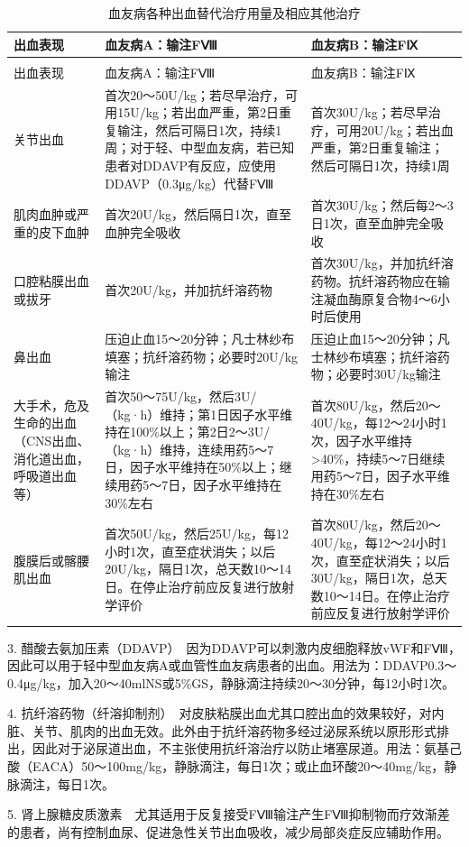 \begin{longtable}[]{p{3cm}p{5cm}p{5cm}}
    \caption{血友病各种出血替代治疗用量及相应其他治疗}
    \label{tab5-5-1}\\
\toprule
出血表现 & 血友病A：输注FⅧ & 血友病B：输注FⅨ\tabularnewline
\midrule
\endfirsthead
\caption[]{血友病各种出血替代治疗用量及相应其他治疗}\\
\toprule
出血表现 & 血友病A：输注FⅧ & 血友病B：输注FⅨ\tabularnewline
\midrule
\endhead
\bottomrule
\endfoot
关节出血 &首次20～50U/kg；若尽早治疗，可用15U/kg；若出血严重，第2日重复输注，然后可隔日1次，持续1周；对于轻、中型血友病，若已知患者对DDAVP有反应，应使用DDAVP（0.3μg/kg）代替FⅧ&首次30U/kg；若尽早治疗，可用20U/kg；若出血严重，第2日重复输注；然后可隔日1次，持续1周\tabularnewline
肌肉血肿或严重的皮下血肿 & 首次20U/kg，然后隔日1次，直至血肿完全吸收 &
首次30U/kg；然后每2～3日1次，直至血肿完全吸收\tabularnewline
口腔粘膜出血或拔牙 & 首次20U/kg，并加抗纤溶药物 &
首次30U/kg，并加抗纤溶药物。抗纤溶药物应在输注凝血酶原复合物4～6小时后使用\tabularnewline
鼻出血 &
压迫止血15～20分钟；凡士林纱布填塞；抗纤溶药物；必要时20U/kg输注
&
压迫止血15～20分钟；凡士林纱布填塞；抗纤溶药物；必要时30U/kg输注\tabularnewline
大手术，危及生命的出血（CNS出血、消化道出血，呼吸道出血等） &首次50～75U/kg，然后3U/（kg·h）维持；第1日因子水平维持在100\%以上；第2日2～3U/（kg·h）维持，连续用药5～7日，因子水平维持在50\%以上；继续用药5～7日，因子水平维持在30\%左右&首次80U/kg，然后20～40U/kg，每12～24小时1次，因子水平维持\textgreater{}40\%，持续5～7日继续用药5～7日，因子水平维持在30\%左右\tabularnewline
腹膜后或髂腰肌出血&首次50U/kg，然后25U/kg，每12小时1次，直至症状消失；以后20U/kg，隔日1次，总天数10～14日。在停止治疗前应反复进行放射学评价&首次80U/kg，然后20～40U/kg，每12～24小时1次，直至症状消失；以后30U/kg，隔日1次，总天数10～14日。在停止治疗前应反复进行放射学评价\tabularnewline
\end{longtable}

3.
醋酸去氨加压素（DDAVP）　因为DDAVP可以刺激内皮细胞释放vWF和FⅧ，因此可以用于轻中型血友病A或血管性血友病患者的出血。用法为：DDAVP0.3～0.4μg/kg，加入20～40mlNS或5\%GS，静脉滴注持续20～30分钟，每12小时1次。

4.
抗纤溶药物（纤溶抑制剂）　对皮肤粘膜出血尤其口腔出血的效果较好，对内脏、关节、肌肉的出血无效。此外由于抗纤溶药物多经过泌尿系统以原形形式排出，因此对于泌尿道出血，不主张使用抗纤溶治疗以防止堵塞尿道。用法：氨基己酸（EACA）50～100mg/kg，静脉滴注，每日1次；或止血环酸20～40mg/kg，静脉滴注，每日1次。

5.
肾上腺糖皮质激素　尤其适用于反复接受FⅧ输注产生FⅧ抑制物而疗效渐差的患者，尚有控制血尿、促进急性关节出血吸收，减少局部炎症反应辅助作用。

